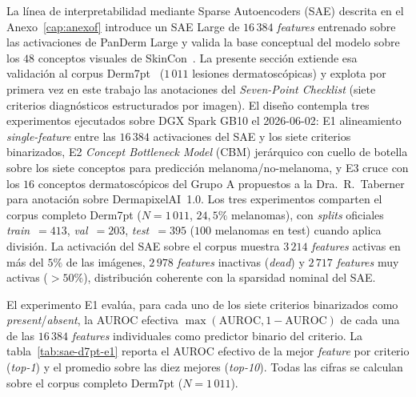 La línea de interpretabilidad mediante Sparse Autoencoders (SAE)
descrita en el Anexo~\ref{cap:anexof} introduce un SAE Large de
$16\,384$ \emph{features} entrenado sobre las activaciones de
PanDerm Large y valida la base conceptual del modelo sobre los
$48$ conceptos visuales de SkinCon~\cite{skincon}. La presente
sección extiende esa validación al corpus
Derm7pt~\cite{kawahara2019} ($1\,011$ lesiones dermatoscópicas) y
explota por primera vez en este trabajo las anotaciones del
\emph{Seven-Point Checklist} (siete criterios diagnósticos
estructurados por imagen). El diseño contempla tres experimentos
ejecutados sobre DGX Spark GB10 el 2026-06-02: E1 alineamiento
\emph{single-feature} entre las $16\,384$ activaciones del SAE y
los siete criterios binarizados, E2 \emph{Concept Bottleneck Model}
(CBM) jerárquico con cuello de botella sobre los siete conceptos
para predicción melanoma/no-melanoma, y E3 cruce con los $16$
conceptos dermatoscópicos del Grupo A propuestos a la
Dra.~R.~Taberner para anotación sobre DermapixelAI~1.0. Los tres
experimentos comparten el corpus completo Derm7pt
($N = 1\,011$, $24{,}5\%$ melanomas), con \emph{splits} oficiales
\emph{train}~$=413$, \emph{val}~$=203$, \emph{test}~$=395$
($100$ melanomas en test) cuando aplica división. La activación
del SAE sobre el corpus muestra $3\,214$ \emph{features} activas en
más del $5\%$ de las imágenes, $2\,978$ \emph{features}
inactivas (\emph{dead}) y $2\,717$ \emph{features} muy activas
($>50\%$), distribución coherente con la sparsidad nominal del
SAE.

El experimento E1 evalúa, para cada uno de los siete criterios
binarizados como \emph{present}/\emph{absent}, la AUROC efectiva
$\max(\mathrm{AUROC}, 1-\mathrm{AUROC})$ de cada una de las
$16\,384$ \emph{features} individuales como predictor binario
del criterio. La tabla~\ref{tab:sae-d7pt-e1} reporta el AUROC
efectivo de la mejor \emph{feature} por criterio
(\emph{top-1}) y el promedio sobre las diez mejores
(\emph{top-10}). Todas las cifras se calculan sobre el corpus
completo Derm7pt ($N = 1\,011$).

